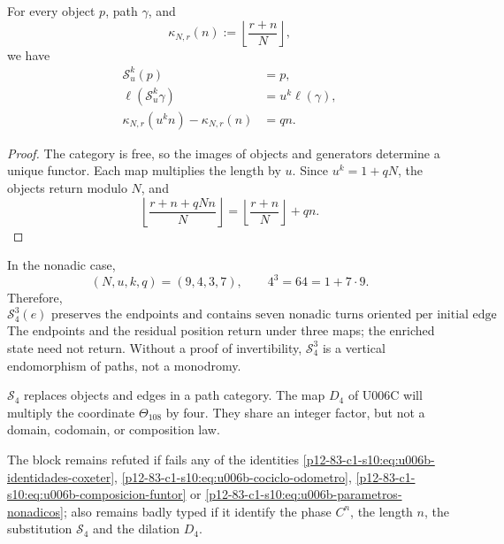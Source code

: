 {\begin{theorem}
\label{p12-83-c1-s10:thm:u006b-elevacion-modular}
For every object \(p\), path \(\gamma\), and
\[
 \kappa_{N,r}(n):=
 \left\lfloor\frac{r+n}{N}\right\rfloor,
\]
we have
\begin{align}
 \mathcal S_u^k(p)&=p,
 \label{p12-83-c1-s10:eq:u006b-retorno-objetos}\\
 \ell(\mathcal S_u^k\gamma)&=u^k\ell(\gamma),
 \label{p12-83-c1-s10:eq:u006b-longitud-sustituida}\\
 \kappa_{N,r}(u^kn)-\kappa_{N,r}(n)&=qn.
 \label{p12-83-c1-s10:eq:u006b-diferencia-vueltas}
\end{align}
\end{theorem}

\begin{proof}
The category is free, so the images of objects and generators
determine a unique functor. Each map multiplies the length by
\(u\). Since \(u^k=1+qN\), the objects return modulo \(N\), and
\[
 \left\lfloor
 \frac{r+n+qNn}{N}
 \right\rfloor
 =
 \left\lfloor\frac{r+n}{N}\right\rfloor+qn.
\]
\end{proof}

In the nonadic case,
\begin{equation}
 (N,u,k,q)=(9,4,3,7),
 \qquad
 4^3=64=1+7\cdot9.
 \label{p12-83-c1-s10:eq:u006b-parametros-nonadicos}
\end{equation}
Therefore,
\begin{equation}
 \boxed{
 \mathcal S_4^3(e)
 \text{ preserves the endpoints and contains seven nonadic turns
 oriented per initial edge}.}
 \label{p12-83-c1-s10:eq:u006b-siete-vueltas}
\end{equation}
The endpoints and the residual position return under three maps; the
enriched state need not return. Without a proof of
invertibility, \(\mathcal S_4^3\) is a vertical endomorphism of paths,
not a monodromy.

\begin{remark}
\label{p12-83-c1-s10:rem:u006b-s4-no-d4}
\(\mathcal S_4\) replaces objects and edges in a path category.
The map \(D_4\) of U006C will multiply the coordinate
\(\Theta_{108}\) by four. They share an integer factor, but not a domain, codomain, or
composition law.
\end{remark}

\begin{criterion}
\label{p12-83-c1-s10:crit:u006b-refutacion}
The block remains refuted if fails any of the identities
\eqref{p12-83-c1-s10:eq:u006b-identidades-coxeter},
\eqref{p12-83-c1-s10:eq:u006b-cociclo-odometro},
\eqref{p12-83-c1-s10:eq:u006b-composicion-funtor} or
\eqref{p12-83-c1-s10:eq:u006b-parametros-nonadicos}; also remains badly typed if it
identify the phase \(C^n\), the length \(n\), the substitution
\(\mathcal S_4\) and the dilation \(D_4\).
\end{criterion}
}%


